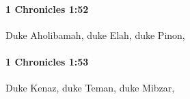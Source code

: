 		\paragraph{1 Chronicles 1:52} %
			\label{1CHRONICLES-1-52}

			Duke Aholibamah, duke Elah, duke Pinon,


		\paragraph{1 Chronicles 1:53} %
			\label{1CHRONICLES-1-53}

			Duke Kenaz, duke Teman, duke Mibzar,


